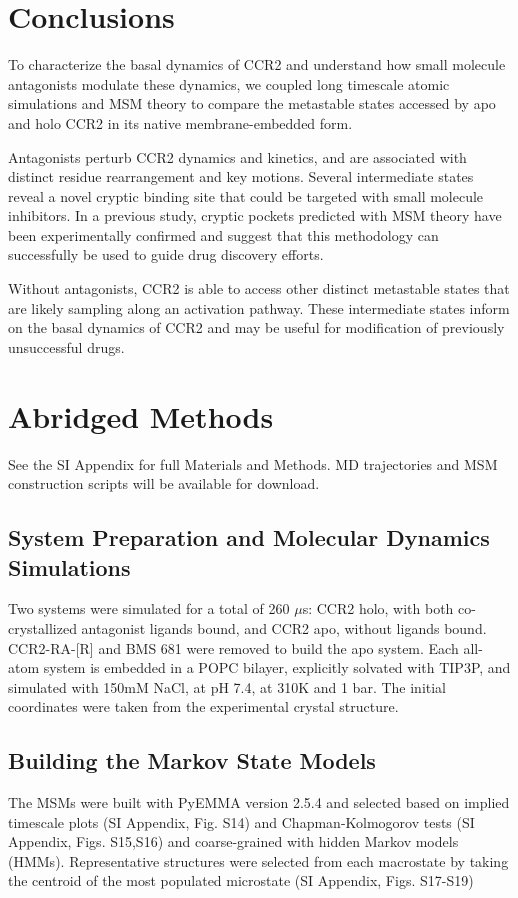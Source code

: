 \section{Conclusions}

To characterize the basal dynamics of CCR2 and understand how small molecule antagonists modulate these dynamics, we coupled long timescale atomic simulations and MSM theory to compare the metastable states accessed by apo and holo CCR2 in its native membrane-embedded form.

Antagonists perturb CCR2 dynamics and kinetics, and are associated with distinct residue rearrangement and key motions.
Several intermediate states reveal a novel cryptic binding site that could be targeted with small molecule inhibitors.
In a previous study\cite{Bowman2015}, cryptic pockets predicted with MSM theory have been experimentally confirmed and suggest that this methodology can successfully be used to guide drug discovery efforts.

Without antagonists, CCR2 is able to access other distinct metastable states that are likely sampling along an activation pathway.
These intermediate states inform on the basal dynamics of CCR2 and may be useful for modification of previously unsuccessful drugs.


\section{Abridged Methods}
See the SI Appendix for full Materials and Methods.
MD trajectories and MSM construction scripts will be available for download.

\subsection{\textbf{System Preparation and Molecular Dynamics Simulations}}
Two systems were simulated for a total of 260 $\mu$s: CCR2 holo, with both co-crystallized antagonist ligands bound, and CCR2 apo, without ligands bound. CCR2-RA-[R] and BMS 681\cite{Zheng2016} were removed to build the apo system. Each all-atom system is embedded in a POPC bilayer, explicitly solvated with TIP3P, and simulated with 150mM NaCl, at pH 7.4, at 310K and 1 bar. The initial coordinates were taken from the experimental crystal structure\cite{Zheng2016}.

\subsection{\textbf{Building the Markov State Models}}
The MSMs were built with PyEMMA version 2.5.4 \cite{Scherer2015} and selected based on implied timescale plots (SI Appendix, Fig. S14) and Chapman-Kolmogorov tests (SI Appendix, Figs. S15,S16) and coarse-grained with hidden Markov models (HMMs).
Representative structures were selected from each macrostate by taking the centroid of the most populated microstate (SI Appendix, Figs. S17-S19)


